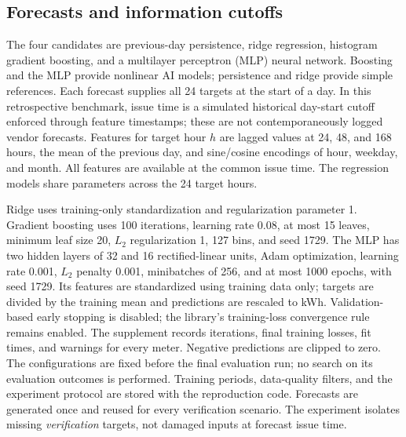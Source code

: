 \subsection{Forecasts and information cutoffs}
The four candidates are previous-day persistence, ridge regression,
histogram gradient boosting, and a multilayer perceptron (MLP) neural
network. Boosting and the MLP provide nonlinear AI models; persistence and
ridge provide simple references. Each forecast supplies all 24 targets at
the start of a day. In this retrospective benchmark, issue time is a
simulated historical day-start cutoff enforced through feature timestamps;
these are not contemporaneously logged vendor forecasts.
Features for target hour $h$ are lagged values at 24, 48, and 168 hours,
the mean of the previous day, and sine/cosine encodings of hour, weekday,
and month. All features are available at the common issue time. The
regression models share parameters across the 24 target hours.

Ridge uses training-only standardization and regularization parameter 1.
Gradient boosting uses 100 iterations, learning rate 0.08, at most 15
leaves, minimum leaf size 20, $L_2$ regularization 1, 127 bins, and seed
1729. The MLP has two hidden layers of 32 and 16 rectified-linear units,
Adam optimization, learning rate 0.001, $L_2$ penalty 0.001, minibatches
of 256, and at most 1000 epochs, with seed 1729. Its features are standardized
using training data only; targets are divided by the training mean and
predictions are rescaled to kWh. Validation-based early stopping is disabled;
the library's training-loss convergence rule remains enabled. The supplement
records iterations, final training losses, fit times, and warnings for every
meter. Negative predictions are clipped to zero. The configurations are
fixed before the final evaluation run; no search on its evaluation outcomes is
performed. Training periods,
data-quality filters, and the experiment protocol are stored with the
reproduction code. Forecasts are generated once and reused for every
verification scenario. The experiment isolates missing \emph{verification}
targets, not damaged inputs at forecast issue time.

